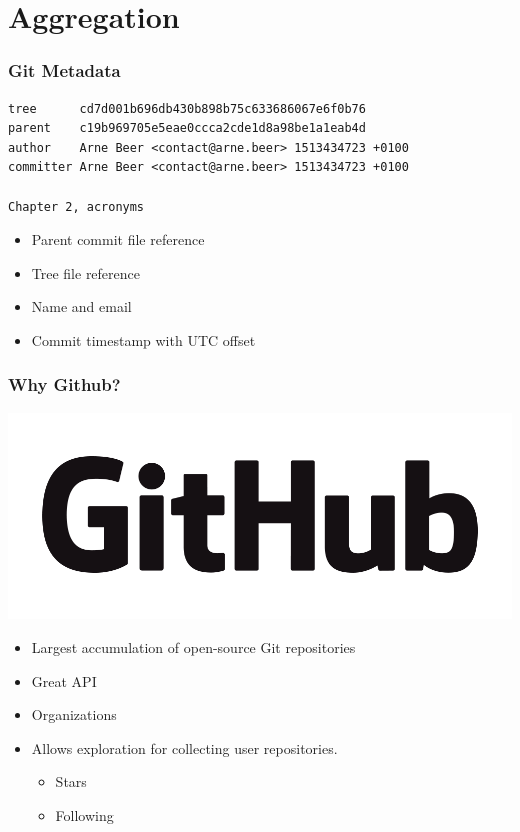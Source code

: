 \documentclass[t]{beamer}
\begin{document}
\section{Aggregation}

\begin{frame}[fragile]
    \frametitle{Git Metadata}
    \begin{verbatim}
tree      cd7d001b696db430b898b75c633686067e6f0b76
parent    c19b969705e5eae0ccca2cde1d8a98be1a1eab4d
author    Arne Beer <contact@arne.beer> 1513434723 +0100
committer Arne Beer <contact@arne.beer> 1513434723 +0100

Chapter 2, acronyms
    \end{verbatim}

    \begin{itemize}
        \item Parent commit file reference
        \item Tree file reference
        \item Name and email
        \item Commit timestamp with UTC offset
    \end{itemize}
\end{frame}

\begin{frame}
    \frametitle{Why Github?}
    \begin{center}
        \includegraphics[scale=0.12]{./pic/github-logo.png}
    \end{center}

    \begin{itemize}
        \item Largest accumulation of open-source Git repositories
        \pause{}
        \item Great API
        \pause{}
        \item Organizations
        \pause{}
        \item Allows exploration for collecting user repositories.
        \begin{itemize}
            \item Stars
            \item Following
        \end{itemize}
    \end{itemize}
\end{frame}
\end{document}
